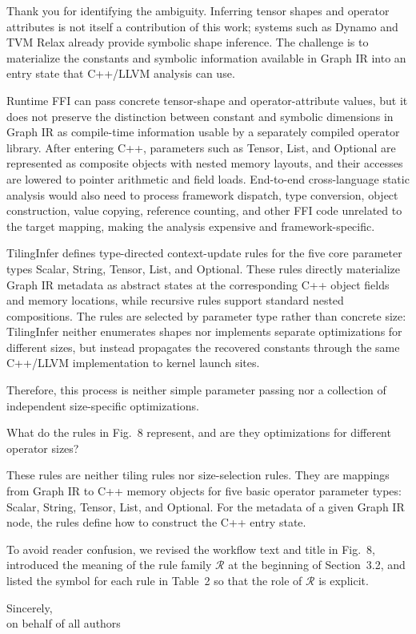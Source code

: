 \authorresponse
Thank you for identifying the ambiguity.  Inferring tensor shapes and operator
attributes is not itself a contribution of this work; systems such as Dynamo
and TVM Relax already provide symbolic shape inference.  The challenge is to
materialize the constants and symbolic information available in Graph IR into
an entry state that C++/LLVM analysis can use.

Runtime FFI can pass concrete tensor-shape and operator-attribute values, but it
does not preserve the distinction between constant and symbolic dimensions in
Graph IR as compile-time information usable by a separately compiled operator
library.  After entering C++, parameters such as Tensor, List, and Optional are
represented as composite objects with nested memory layouts, and their accesses
are lowered to pointer arithmetic and field loads.  End-to-end cross-language
static analysis would also need to process framework dispatch, type conversion,
object construction, value copying, reference counting, and other FFI code
unrelated to the target mapping, making the analysis expensive and
framework-specific.

TilingInfer defines type-directed context-update rules for the five core
parameter types Scalar, String, Tensor, List, and Optional.  These rules
directly materialize Graph IR metadata as abstract states at the corresponding
C++ object fields and memory locations, while recursive rules support standard
nested compositions.  The rules are selected by parameter type rather than
concrete size: TilingInfer neither enumerates shapes nor implements separate
optimizations for different sizes, but instead propagates the recovered
constants through the same C++/LLVM implementation to kernel launch sites.

Therefore, this process is neither simple parameter passing nor a collection
of independent size-specific optimizations.


{What do the rules in Fig.~8 represent, and are they optimizations for
different operator sizes?}

\authorresponse
These rules are neither tiling rules nor size-selection rules.  They are
mappings from Graph IR to C++ memory objects for five basic operator parameter
types: Scalar, String, Tensor, List, and Optional.  For the metadata of a given
Graph IR node, the rules define how to construct the C++ entry state.

To avoid reader confusion, we revised the workflow text and title in Fig.~8,
introduced the meaning of the rule family $\mathcal{R}$ at the beginning of
Section~3.2, and listed the symbol for each rule in Table~2 so that the role of
$\mathcal{R}$ is explicit.


\enlargethispage{3\baselineskip}
\noindent Sincerely,\\
on behalf of all authors
